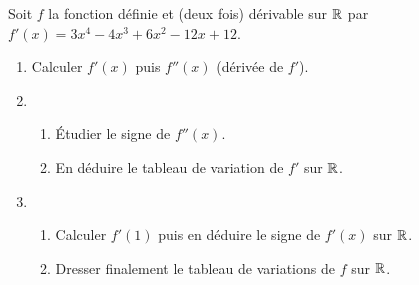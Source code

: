 \documentclass[a4paper,11pt]{article}
\begin{document}
\medskip


\medskip

Soit $f$ la fonction définie et (deux fois) dérivable sur $\R$ par $f'(x)=3x^4-4x^3+6x^2-12x+12$.
%
\begin{enumerate}
	\item Calculer $f'(x)$ puis $f''(x)$ (dérivée de $f'$).
	\item
	\begin{enumerate}
		\item Étudier le signe de $f''(x)$.
		\item En déduire le tableau de variation de $f'$ sur $\R$.
	\end{enumerate}
	\item 
	\begin{enumerate}
		\item Calculer $f'(1)$ puis en déduire le signe de $f'(x)$ sur $\R$.
		\item Dresser finalement le tableau de variations de $f$ sur $\R$.
	\end{enumerate}
\end{enumerate}
\end{document}
